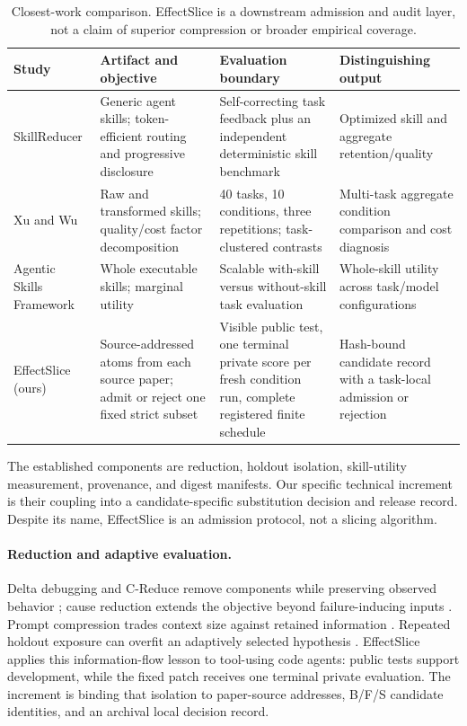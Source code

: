 \documentclass[letterpaper]{article} %
\begin{document}
\begin{table}[t]
\centering
\small
\setlength{\tabcolsep}{4pt}
\begin{tabular}{p{}p{}p{}p{}}
\toprule
Study & Artifact and objective & Evaluation boundary & Distinguishing output \\
\midrule
SkillReducer \cite{gao2026skillreducer} & Generic agent skills; token-efficient
routing and progressive disclosure & Self-correcting task feedback plus an
independent deterministic skill benchmark & Optimized skill and aggregate
retention/quality \\
Xu and Wu \cite{xu2026compression} & Raw and transformed skills; quality/cost
factor decomposition & 40 tasks, 10 conditions, three repetitions; task-clustered
contrasts & Multi-task aggregate condition comparison and cost diagnosis \\
Agentic Skills Framework \cite{shaposhnikov2026agenticskills} & Whole executable
skills; marginal utility & Scalable with-skill versus without-skill task
evaluation & Whole-skill utility across task/model configurations \\
EffectSlice (ours) & Source-addressed atoms from each source paper; admit or reject one
fixed strict subset & Visible public test, one terminal private score per fresh condition run, complete
registered finite schedule & Hash-bound candidate record with a task-local
admission or rejection \\
\bottomrule
\end{tabular}
\caption{Closest-work comparison.  EffectSlice is a downstream admission and
audit layer, not a claim of superior compression or broader empirical coverage.}
\label{tab:closest}
\end{table}

The established components are reduction, holdout isolation, skill-utility
measurement, provenance, and digest manifests.  Our specific technical increment is
their coupling into a candidate-specific substitution decision and release record.
Despite its name, EffectSlice is an admission protocol, not a slicing algorithm.

\paragraph{Reduction and adaptive evaluation.}
Delta debugging and C-Reduce remove components while preserving observed behavior
\cite{zeller2002simplifying,regehr2012creduce}; cause reduction extends the
objective beyond failure-inducing inputs \cite{groce2016cause}.  Prompt compression
trades context size against retained information
\cite{jiang2023llmlingua,pan2024llmlingua2,liskavets2025contextcompression}.
Repeated holdout exposure can overfit an adaptively selected hypothesis
\cite{dwork2015reusableholdout,nakkiran2018genericholdout}.  EffectSlice applies
this information-flow lesson to tool-using code agents: public tests support
development, while the fixed patch receives one terminal private evaluation.  The
increment is binding that isolation to paper-source addresses, B/F/S candidate
identities, and an archival local decision record.
\end{document}
